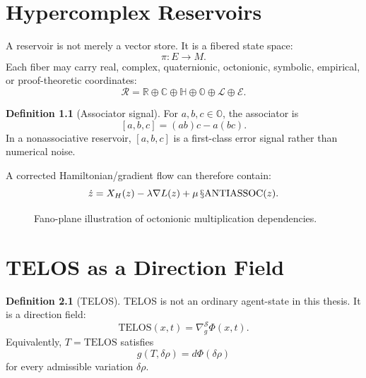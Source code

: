 \documentclass[11pt,oneside]{book}
\theoremstyle{definition}
\newtheorem{definition}{Definition}[chapter]
\theoremstyle{plain}
\theoremstyle{remark}
\newcommand{\Sop}[1]{\mathsection\mathrm{#1}}
\newcommand{\Telos}{\mathrm{TELOS}}
\begin{document}
\chapter{Hypercomplex Reservoirs}

A reservoir is not merely a vector store.  It is a fibered state space:
\[
  \pi:E\to M.
\]
Each fiber may carry real, complex, quaternionic, octonionic, symbolic, empirical, or
proof-theoretic coordinates:
\[
\mathcal R=
\mathbb R\oplus\mathbb C\oplus\mathbb H\oplus\mathbb O
\oplus\mathcal L\oplus\mathcal E.
\]

\begin{definition}[Associator signal]
For \(a,b,c\in\mathbb O\), the associator is
\[
  [a,b,c]=(ab)c-a(bc).
\]
In a nonassociative reservoir, \([a,b,c]\) is a first-class error signal rather than
numerical noise.
\end{definition}

A corrected Hamiltonian/gradient flow can therefore contain:
\[
\dot z=X_H(z)-\lambda\nabla L(z)+\mu\,\Sop{ANTIASSOC}(z).
\]

\begin{figure}[ht]
\centering
{}
\caption{Fano-plane illustration of octonionic multiplication dependencies.}
\end{figure}

\chapter{TELOS as a Direction Field}

\begin{definition}[TELOS]
TELOS is not an ordinary agent-state in this thesis.  It is a direction field:
\[
  \Telos(x,t)=\nabla_g^{\mathcal S}\Phi(x,t).
\]
Equivalently, \(T=\Telos\) satisfies
\[
  g(T,\delta\rho)=d\Phi(\delta\rho)
\]
for every admissible variation \(\delta\rho\).
\end{definition}
\end{document}
